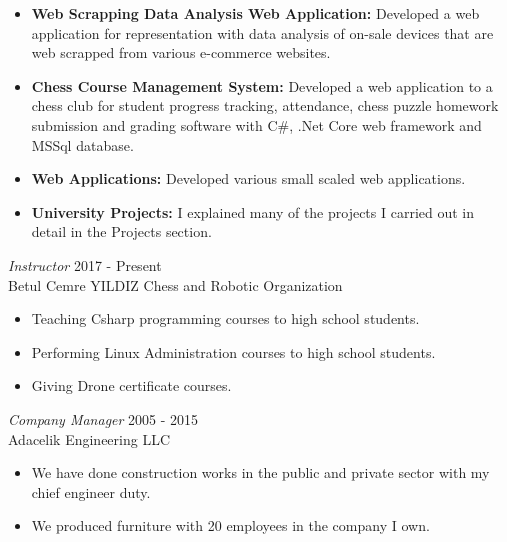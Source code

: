 \documentclass[line,margin]{res}
\begin{document}
\begin{resume}
\begin{itemize}
\begin{itemize}
                         \end{itemize}
                 \item \textbf{Web Scrapping Data Analysis Web Application: } Developed a web application for representation with data analysis of on-sale devices that are web scrapped from various e-commerce websites. 
                 \item \textbf{Chess Course Management System: } Developed a web application to a chess club for student progress tracking, attendance, chess puzzle homework submission and grading software with C\#, .Net Core web framework and MSSql database. 
                \item \textbf{Web Applications: } Developed various small scaled web applications.
                \item \textbf{University Projects: } I explained many of the projects I carried out in detail in the Projects section.
                \end{itemize}
 
                {\sl  Instructor} \hfill             2017 - Present \\
                Betul Cemre YILDIZ Chess and Robotic Organization
                 \begin{itemize}  \itemsep -2pt %
                 \item Teaching Csharp programming courses to high school students.
                 \item Performing  Linux Administration courses to high school students.
                 \item Giving Drone certificate courses.
                 \end{itemize} 

                 
                {\sl Company Manager} \hfill        2005 - 2015 \\
                Adacelik Engineering LLC
                  \begin{itemize}
                   \item We have done construction works in the public and private sector with my chief engineer duty.
                     
                   \item We produced furniture with 20 employees in the company I own.
                   \end{itemize} 

\noindent\hrulefill

\end{resume}
\end{document}
